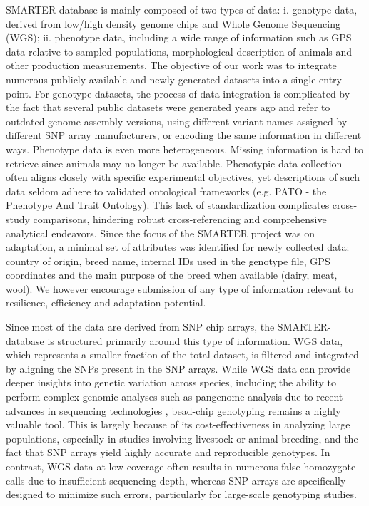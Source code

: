 \documentclass[a4paper,num-refs,gigabyte]{oup-contemporary}
\begin{document}
SMARTER-database is mainly composed of two types of data: i. genotype data, derived from low/high density genome chips and Whole Genome Sequencing (WGS); ii. phenotype data, including a wide range of information such as GPS data relative to sampled populations, morphological description of animals and other production measurements.
The objective of our work was to integrate numerous publicly available and newly generated datasets into a single entry point.
For genotype datasets, the process of data integration is complicated by the fact that several public datasets were generated years ago and refer to outdated genome assembly versions, using different variant names assigned by different SNP array manufacturers, or encoding the same information in different ways. Phenotype data is even more heterogeneous. Missing information is hard to retrieve since animals may no longer be available. Phenotypic data collection often aligns closely with specific experimental objectives, yet descriptions of such data seldom adhere to validated ontological frameworks (e.g. PATO - the Phenotype And Trait Ontology\citep{PATO}). This lack of standardization complicates cross-study comparisons, hindering robust cross-referencing and comprehensive analytical endeavors. Since the focus of the SMARTER project was on adaptation, a minimal set of attributes was identified for newly collected data: country of origin, breed name, internal IDs used in the genotype file, GPS coordinates and the main purpose of the breed when available (dairy, meat, wool).  We however encourage submission of any type of information relevant to resilience, efficiency and adaptation potential.

Since most of the data are derived from SNP chip arrays, the SMARTER-database is structured primarily around this type of information. WGS data, which represents a smaller fraction of the total dataset, is filtered and integrated by aligning the SNPs present in the SNP arrays. While WGS data can provide deeper insights into genetic variation across species, including the ability to perform complex genomic analyses such as pangenome analysis due to recent advances in sequencing technologies \citep{Gong2023}, bead-chip genotyping remains a highly valuable tool. This is largely because of its cost-effectiveness in analyzing large populations, especially in studies involving livestock or animal breeding, and the fact that SNP arrays yield highly accurate and reproducible genotypes. In contrast, WGS data at low coverage often results in numerous false homozygote calls due to insufficient sequencing depth, whereas SNP arrays are specifically designed to minimize such errors, particularly for large-scale genotyping studies\citep{Fan2006,Sun2021}.
\end{document}
